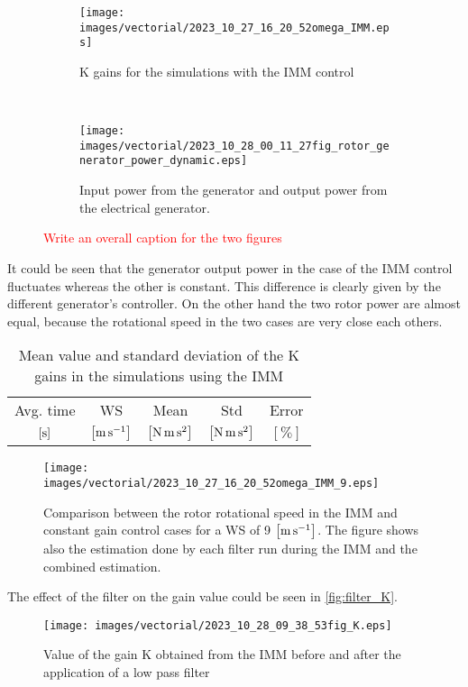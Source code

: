 \begin{figure}[htb]
  \centering
  \begin{subfigure}{0.49\textwidth}
    \centering
    \texttt{[image: images/vectorial/2023\_10\_27\_16\_20\_52omega\_IMM.eps]}
    \caption{K gains for the simulations with the IMM control}
    \label{fig:fig_K_IMM}
  \end{subfigure}
  \\
  \begin{subfigure}{0.65\textwidth}
    \centering
    \texttt{[image: images/vectorial/2023\_10\_28\_00\_11\_27fig\_rotor\_generator\_power\_dynamic.eps]}
    \caption{Input power from the generator and output power from the electrical generator. }
    \label{fig:fig_power_IMM}
  \end{subfigure}
  \caption{\textcolor{red}{Write an overall caption for the two figures}}
\end{figure}
It could be seen that the generator output power in the case of the IMM control fluctuates whereas the other is constant. This difference is clearly given by the different generator's controller. On the other hand the two rotor power are almost equal, because the rotational speed in the two cases are very close each others. 

\begin{table}[htb]
  \caption{Mean value and standard deviation of the K gains in the simulations using the IMM}
  \centering
  \begin{tabular}{ccccc}
    \toprule
    Avg. time & WS & Mean & Std & Error \\
    $\left[\si{\second}\right]$ & $\left[\si{\meter\per\second}\right]$ & $\left[\si{\newton\meter\square\second}\right]$ & $\left[\si{\newton\meter\square\second}\right]$ & $\left[\%\right]$\\  \midrule
    
  \end{tabular}
  \label{tab:mean_std_IMM}
\end{table}

\begin{figure}[htb]
  \centering
  \texttt{[image: images/vectorial/2023\_10\_27\_16\_20\_52omega\_IMM\_9.eps]}
  \caption{Comparison between the rotor rotational speed in the IMM and constant gain control cases for a WS of 9 $\left[\si{\meter\per\second}\right]$. The figure shows also the estimation done by each filter run during the IMM and the combined estimation.}
  \label{fig:fig_omega_IMM}
\end{figure}

The effect of the filter on the gain value could be seen in \autoref{fig:filter_K}.
\begin{figure}
  \centering
  \texttt{[image: images/vectorial/2023\_10\_28\_09\_38\_53fig\_K.eps]}
  \caption{Value of the gain K obtained from the IMM before and after the application of a low pass filter}
  \label{fig:filter_K}
\end{figure}
